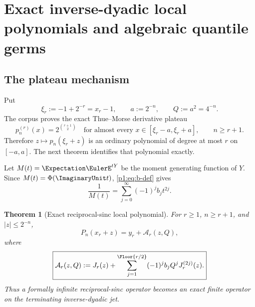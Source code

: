 \documentclass[11pt,oneside]{article}
\numberwithin{equation}{section}
\newtheorem{theorem}{Theorem}[section]
\theoremstyle{definition}
\theoremstyle{remark}
\newcommand{\Fn}{P_n}
\begin{document}
\section{Exact inverse-dyadic local polynomials and algebraic quantile germs}
\label{p1:sec:exact-local}

\subsection{The plateau mechanism}

Put
\begin{equation}
 \xi_r:=-1+2^{-r}=x_r-1,
 \qquad a:=2^{-n},\qquad Q:=a^2=4^{-n}.
 \label{p1:eq:xi-a-Q}
\end{equation}
The corpus proves the exact Thue--Morse derivative plateau
\begin{equation}
 p_n^{(r)}(x)=2^{\binom{r+1}{2}}
 \quad\text{for almost every }x\in[\xi_r-a,\xi_r+a],
 \qquad n\ge r+1.
 \label{p1:eq:plateau-imported}
\end{equation}
Therefore $z\mapsto p_n(\xi_r+z)$ is an ordinary polynomial of degree at most
$r$ on $[-a,a]$.  The next theorem identifies that polynomial exactly.

Let $M(t)=\Expectation\EulerE^{tY}$ be the moment generating function of $Y$.  Since
$M(t)=\Phi(\ImaginaryUnit t)$, \eqref{p1:eq:b-def} gives
\begin{equation}
 \frac1{M(t)}=\sum_{j=0}^{\infty}(-1)^jb_jt^{2j}.
 \label{p1:eq:reciprocal-MGF}
\end{equation}

\begin{theorem}[Exact reciprocal-sinc local polynomial]
\label{p1:thm:exact-local-polynomial}
For $r\ge1$, $n\ge r+1$, and $|z|\le2^{-n}$,
\begin{equation}
 \boxed{
 \Fn(x_r+z)=y_r+\mathcal A_r(z,Q),}
 \label{p1:eq:exact-local-Pn}
\end{equation}
where
\begin{equation}
 \boxed{
 \mathcal A_r(z,Q):=
 J_r(z)+\sum_{j=1}^{\Floor{r/2}}
 (-1)^jb_jQ^jJ_r^{(2j)}(z).}
 \label{p1:eq:Ar-def}
\end{equation}
Thus a formally infinite reciprocal-sinc operator becomes an exact finite operator on the
terminating inverse-dyadic jet.
\end{theorem}
\end{document}
